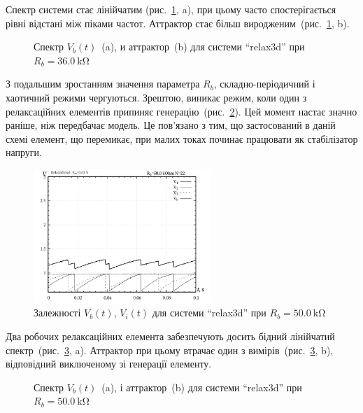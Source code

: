 Спектр системи стає лінійчатим (рис.~\ref{atu:f:relax3d_f_09}, a), при
цьому часто спостерігається рівні відстані між піками
частот. Аттрактор стає більш виродженим~(рис.~\ref{atu:f:relax3d_f_09}, b).

\begin{figure}[htb!]
  \caption{Спектр $V_b(t)$~(a), и аттрактор~(b) для системи ``relax3d'' при $R_b=\SI{36.0}{\kilo\ohm}$ }
  \label{atu:f:relax3d_f_09}
\end{figure}

З подальшим зростанням значення параметра
$R_b$, складно-періодичний і хаотичний режими чергуються. Зрештою,
виникає режим, коли один з релаксаційних елементів припиняє
генерацію~(рис.~\ref{atu:f:relax3d_t_22}). Цей момент настає значно раніше,
ніж передбачає модель. Це пов'язано з тим, що застосований в даній
схемі елемент, що перемикає, при малих токах починає працювати
як стабілізатор напруги.

\begin{figure}[htb!]
  \centerline{\includegraphics[width=0.6\textwidth]{p/relax3d_t_22.png} }
\caption{Залежності $V_b(t)$, $V_i(t)$ для системи ``relax3d'' при $ R_b = \SI{50.0}{\kilo \ohm} $}
\label{atu:f:relax3d_t_22}
\end{figure}

Два робочих релаксаційних елемента забезпечують досить
бідний лінійчатий спектр~(рис.~\ref{atu:f:relax3d_f_22}, a). Аттрактор при
цьому втрачає один з вимірів~(рис.~\ref{atu:f:relax3d_f_22}, b), відповідний
виключеному зі генерації елементу.

\begin{figure}[htb!]
  \caption{Спектр $V_b(t)$~(a), і аттрактор~(b) для системи ``relax3d'' при $ R_b = \SI{50.0}{\kilo \ohm} $}
\label{atu:f:relax3d_f_22}
\end{figure}

